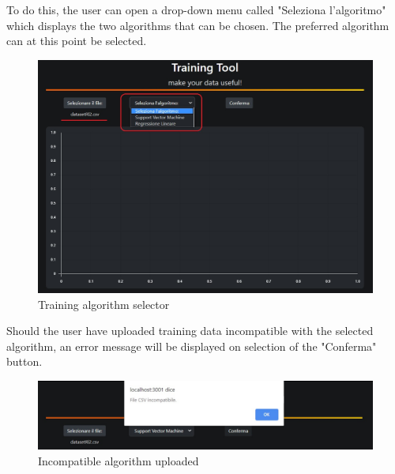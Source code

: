 To do this, the user can open a drop-down menu called "Seleziona l'algoritmo" which displays the two algorithms that can be chosen. The preferred algorithm can at this point be selected.
\begin{figure}[H]
\centering
\includegraphics[scale=0.65]{img/tool/algo_selector.png}
\caption{Training algorithm selector}
\end{figure}
Should the user have uploaded training data incompatible with the selected algorithm, an error message will be displayed on selection of the "Conferma" button.\newline
\begin{figure}[H]
\centering
\includegraphics[scale=0.65]{img/tool/err_msg_algo.png}
\caption{Incompatible algorithm uploaded}
\end{figure}
\newpage
